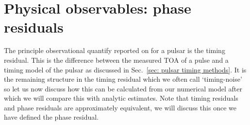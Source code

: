\documentclass[../full_thesis/full_thesis.tex]{subfiles}
\begin{document}
%
%
%

\section{Physical observables: phase residuals}
\label{sec: timing residuals}

The principle observational quantify reported on for a pulsar is the timing
residual. This is the difference between the measured TOA of a pulse and a
timing model of the pulsar as discussed in Sec.~\ref{sec: pulsar timing
methods}. It is the remaining structure in the timing residual which we
often call `timing-noise' so let us now discuss how this can be calculated
from our numerical model after which we will compare this with analytic
estimates. Note that timing residuals and phase residuals are approximately
equivalent, we will discuss this once we have defined the phase residual.
\end{document}
